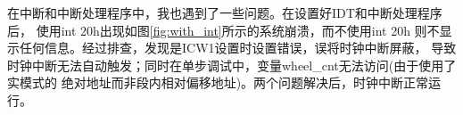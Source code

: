 \documentclass[12pt,a4paper,UTF8]{ctexart}
\begin{document}
\begin{figure}[htbp]
\centering
{}
\end{figure}

在中断和中断处理程序中，我也遇到了一些问题。在设置好IDT和中断处理程序后，
使用int 20h出现如图\ref{fig:with_int}所示的系统崩溃，而不使用int 20h
则不显示任何信息。经过排查，发现是ICW1设置时设置错误，误将时钟中断屏蔽，
导致时钟中断无法自动触发；同时在单步调试中，变量wheel\_cnt无法访问(由于使用了实模式的
绝对地址而非段内相对偏移地址)。两个问题解决后，时钟中断正常运行。
\end{document}
